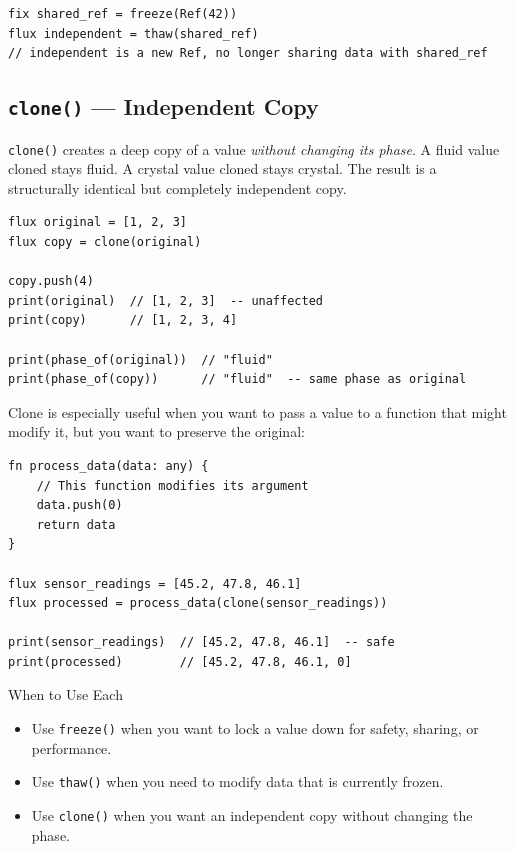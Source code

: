 \begin{lstlisting}[language=Lattice, caption={Thawing a Ref breaks sharing}]
fix shared_ref = freeze(Ref(42))
flux independent = thaw(shared_ref)
// independent is a new Ref, no longer sharing data with shared_ref
\end{lstlisting}

\subsection{\texttt{clone()} --- Independent Copy}\label{subsec:clone}

\lstinline|clone()| creates a deep copy of a value \emph{without changing its phase}.
A fluid value cloned stays fluid.
A crystal value cloned stays crystal.
The result is a structurally identical but completely independent copy.

\begin{lstlisting}[language=Lattice, caption={The \texttt{clone()} function}]
flux original = [1, 2, 3]
flux copy = clone(original)

copy.push(4)
print(original)  // [1, 2, 3]  -- unaffected
print(copy)      // [1, 2, 3, 4]

print(phase_of(original))  // "fluid"
print(phase_of(copy))      // "fluid"  -- same phase as original
\end{lstlisting}

Clone is especially useful when you want to pass a value to a function that might modify it, but you want to preserve the original:

\begin{lstlisting}[language=Lattice, caption={Cloning for safe function calls}]
fn process_data(data: any) {
    // This function modifies its argument
    data.push(0)
    return data
}

flux sensor_readings = [45.2, 47.8, 46.1]
flux processed = process_data(clone(sensor_readings))

print(sensor_readings)  // [45.2, 47.8, 46.1]  -- safe
print(processed)        // [45.2, 47.8, 46.1, 0]
\end{lstlisting}

\begin{tipbox}{When to Use Each}
\begin{itemize}
  \item Use \lstinline|freeze()| when you want to lock a value down for safety, sharing, or performance.
  \item Use \lstinline|thaw()| when you need to modify data that is currently frozen.
  \item Use \lstinline|clone()| when you want an independent copy without changing the phase.
\end{itemize}
\end{tipbox}

